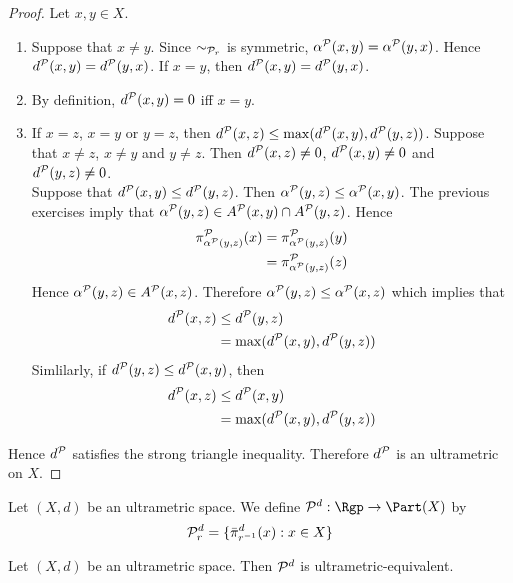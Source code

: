 \documentclass{book}
\begin{document}
\begin{proof}
	Let $x, y \in X$. 
	\begin{enumerate}
			\item Suppose that $x \neq y$. Since $\sim_{\mathcal{P}_r}$ is symmetric, $\alpha^{\mathcal{P}}(x,y) = \alpha^{\mathcal{P}}(y,x)$. Hence $d^{\mathcal{P}}(x,y) = d^{\mathcal{P}}(y,x)$. If $x = y$, then $d^{\mathcal{P}}(x,y) = d^{\mathcal{P}}(y,x)$. 
			\item By definition, $d^{\mathcal{P}}(x,y) = 0$ iff $x = y$.  
			\item If $x = z$, $x = y$ or $y=z$, then $d^{\mathcal{P}}(x,z) \leq \max(d^{\mathcal{P}}(x,y), d^{\mathcal{P}}(y,z))$. Suppose that $x \neq z$, $x \neq y$ and $y \neq z$. Then $d^{\mathcal{P}}(x,z) \neq 0$, $d^{\mathcal{P}}(x,y) \neq 0$ and $d^{\mathcal{P}}(y,z) \neq 0$. \\
			Suppose that $d^{\mathcal{P}}(x,y) \leq d^{\mathcal{P}}(y,z)$. Then $\alpha^{\mathcal{P}}(y,z) \leq \alpha^{\mathcal{P}}(x,y)$. The previous exercises imply that $\alpha^{\mathcal{P}}(y,z) \in A^{\mathcal{P}}(x,y) \cap A^{\mathcal{P}}(y,z)$. Hence
			\begin{align*}
				\pi^{\mathcal{P}}_{\alpha^{\mathcal{P}}(y,z)}(x) 
				& = \pi^{\mathcal{P}}_{\alpha^{\mathcal{P}}(y,z)}(y) \\
				& = \pi^{\mathcal{P}}_{\alpha^{\mathcal{P}}(y,z)}(z)
			\end{align*}
			Hence $\alpha^{\mathcal{P}}(y,z) \in A^{\mathcal{P}}(x, z)$. Therefore $\alpha^{\mathcal{P}}(y,z) \leq \alpha^{\mathcal{P}}(x,z)$ which implies that 
			\begin{align*}
				d^{\mathcal{P}}(x,z) 
				& \leq d^{\mathcal{P}}(y,z) \\
				& = \max(d^{\mathcal{P}}(x,y), d^{\mathcal{P}}(y,z))
			\end{align*}
			Simlilarly, if $d^{\mathcal{P}}(y,z) \leq d^{\mathcal{P}}(x,y)$, then 
			\begin{align*}
				d^{\mathcal{P}}(x,z) 
				& \leq d^{\mathcal{P}}(x,y) \\
				& = \max(d^{\mathcal{P}}(x,y), d^{\mathcal{P}}(y,z))
			\end{align*}
		\end{enumerate}
		Hence $d^{\mathcal{P}}$ satisfies the strong triangle inequality. Therefore $d^{\mathcal{P}}$ is an ultrametric on $X$.  
\end{proof}

\begin{defn}
	Let $(X, d)$ be an ultrametric space. We define $\MP^d: \Rgp \rightarrow \Part(X)$ by $$\mathcal{P}^d_r = \{\bar{\pi}^d_{r^{-1}}(x): x \in X\}$$
\end{defn}

\begin{ex}
	Let $(X, d)$ be an ultrametric space. Then $\mathcal{P}^d$ is ultrametric-equivalent.
\end{ex}
\end{document}
